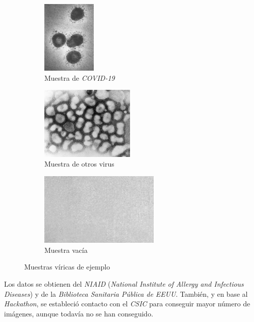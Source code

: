 \documentclass{uc3mpracticas}
\begin{document}
  \begin{figure}[!h]
    \centering
    \begin{subfigure}[b]{0.3\textwidth}
      \includegraphics[angle=90, width=\textwidth, height=35mm, frame]{Images/coronaviridae/coronaviridae_0001.jpg}
      \caption{Muestra de \textit{COVID-19}}
    \end{subfigure}
    \hfill
    \begin{subfigure}[b]{0.3\textwidth}
      \includegraphics[width=\textwidth, height=35mm, frame]{Images/other/other_0021.jpg}
      \caption{Muestra de otros virus}
    \end{subfigure}
    \hfill
    \begin{subfigure}[b]{0.3\textwidth}
      \includegraphics[width=\textwidth, height=35mm, frame]{Images/blank/blank_0019.jpg}
      \caption{Muestra vacía}
    \end{subfigure}

    \caption{Muestras víricas de ejemplo}
  \end{figure}


  \vspace{5mm}

  Los datos se obtienen del \textit{NIAID} (\textit{National Institute of Allergy and Infectious Diseases}) y de la \textit{Biblioteca Sanitaria Pública de EEUU}. También, y en base al \textit{Hackathon}, se estableció contacto con el \textit{CSIC} para conseguir mayor número de imágenes, aunque todavía no se han conseguido.
\end{document}

